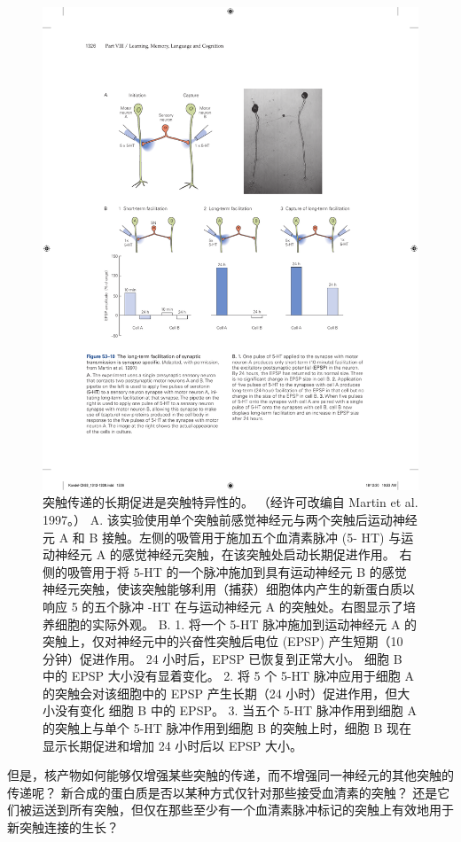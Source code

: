 \begin{figure}[htbp]
	\centering
	\includegraphics[width=0.9\linewidth]{chap53/fig_53_10}
	\caption{突触传递的长期促进是突触特异性的。 （经许可改编自 Martin et al. 1997。） A. 该实验使用单个突触前感觉神经元与两个突触后运动神经元 A 和 B 接触。左侧的吸管用于施加五个血清素脉冲 (5- HT) 与运动神经元 A 的感觉神经元突触，在该突触处启动长期促进作用。 右侧的吸管用于将 5-HT 的一个脉冲施加到具有运动神经元 B 的感觉神经元突触，使该突触能够利用（捕获）细胞体内产生的新蛋白质以响应 5 的五个脉冲 -HT 在与运动神经元 A 的突触处。右图显示了培养细胞的实际外观。 B. 1. 将一个 5-HT 脉冲施加到运动神经元 A 的突触上，仅对神经元中的兴奋性突触后电位 (EPSP) 产生短期（10 分钟）促进作用。 24 小时后，EPSP 已恢复到正常大小。 细胞 B 中的 EPSP 大小没有显着变化。 2. 将 5 个 5-HT 脉冲应用于细胞 A 的突触会对该细胞中的 EPSP 产生长期（24 小时）促进作用，但大小没有变化 细胞 B 中的 EPSP。 3. 当五个 5-HT 脉冲作用到细胞 A 的突触上与单个 5-HT 脉冲作用到细胞 B 的突触上时，细胞 B 现在显示长期促进和增加 24 小时后以 EPSP 大小。}
	\label{fig:53_10}
\end{figure}

但是，核产物如何能够仅增强某些突触的传递，而不增强同一神经元的其他突触的传递呢？ 新合成的蛋白质是否以某种方式仅针对那些接受血清素的突触？ 还是它们被运送到所有突触，但仅在那些至少有一个血清素脉冲标记的突触上有效地用于新突触连接的生长？

